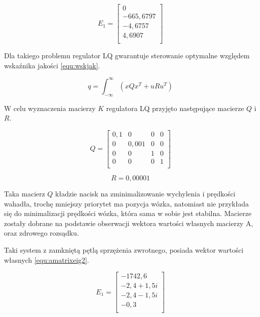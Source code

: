 \documentclass[12pt]{article}
\begin{document}
\begin{equation}
    E_1 = 
    \begin{bmatrix}
              0\\
      -665,6797\\
        -4,6757\\
         4,6907\\
    \end{bmatrix}
    \label{equ:amatrixeig1}
\end{equation}

Dla takiego problemu regulator LQ gwarantuje sterowanie optymalne względem
wskaźnika jakości \eqref{equ:wskjak}.

\begin{equation}
    q = \int_{-\infty}^{\infty}(xQx^T + uRu^T)
    \label{equ:wskjak}
\end{equation}

W celu wyznaczenia macierzy $K$ regulatora LQ przyjęto następujące macierze $Q$
i $R$.

\begin{equation}
    Q = 
    \begin{bmatrix}
        0,1 & 0 & 0 & 0\\
        0 & 0,001 & 0 & 0\\
        0 & 0 & 1 & 0\\
        0 & 0 & 0 & 1\\
    \end{bmatrix}
    \label{equ:lqq}
\end{equation}

\begin{equation}
    R = 0,00001
    \label{equ:lqr}
\end{equation}

Taka macierz $Q$ kładzie nacisk na zminimalizowanie wychylenia i prędkości
wahadła, trochę mniejszy priorytet ma pozycja wózka, natomiast nie przykłada się
do minimalizacji prędkości wózka, która sama w sobie jest stabilna. Macierze
zostały dobrane na podstawie obserwacji wektora wartości własnych macierzy A,
oraz zdrowego rozsądku.

Taki system z zamkniętą pętlą sprzężenia zwrotnego, posiada wektor wartości
własnych \eqref{equ:amatrixeig2}.

\begin{equation}
    E_1 = 
    \begin{bmatrix}
      -1742,6\\
      -2,4 + 1,5i\\
      -2,4 - 1,5i\\
      -0,3\\
    \end{bmatrix}
    \label{equ:amatrixeig2}
\end{equation}
\end{document}
